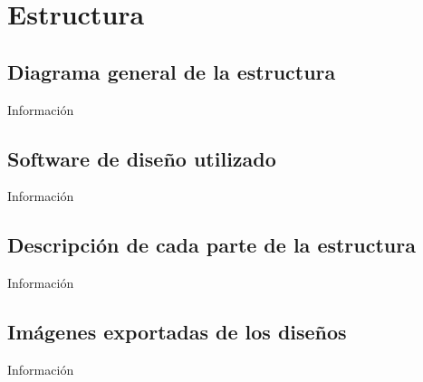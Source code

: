\chapter{Estructura}

\section{Diagrama general de la estructura}
Información

\section{Software de diseño utilizado}
Información

\section{Descripción de cada parte de la estructura}
Información

\section{Imágenes exportadas de los diseños}
Información